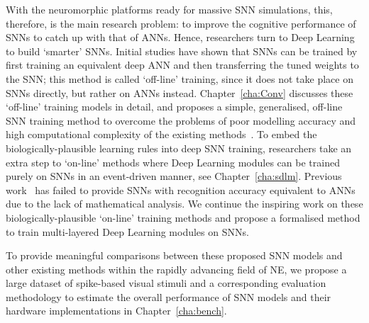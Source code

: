 

With the neuromorphic platforms ready for massive SNN simulations, this, therefore, is the main research problem: to improve the cognitive performance of SNNs to catch up with that of ANNs.
Hence, researchers turn to Deep Learning to build `smarter' SNNs.
Initial studies have shown that SNNs can be trained by first training an equivalent deep ANN and then transferring the tuned weights to the SNN;
this method is called `off-line' training, since it does not take place on SNNs directly, but rather on ANNs instead.
Chapter~\ref{cha:Conv} discusses these `off-line' training models in detail, and proposes a simple, generalised, off-line SNN training method to overcome the problems of poor modelling accuracy and high computational complexity of the existing methods~\citep{Jug_etal_2012,hunsberger2015spiking,diehl2015fast}.
To embed the biologically-plausible learning rules into deep SNN training, researchers take an extra step to `on-line' methods where Deep Learning modules can be trained purely on SNNs in an event-driven manner, see Chapter~\ref{cha:sdlm}.
Previous work~\citep{neil2013online,neftci2013event,burbank2015mirrored} has failed to provide SNNs with recognition accuracy equivalent to ANNs due to the lack of mathematical analysis.
We continue the inspiring work on these biologically-plausible `on-line' training methods and propose a formalised method to train multi-layered Deep Learning modules on SNNs.

To provide meaningful comparisons between these proposed SNN models and other existing methods within the rapidly advancing field of NE, we propose a large dataset of spike-based visual stimuli \DIFaddbegin {}\DIFaddend and a corresponding evaluation methodology to estimate the overall performance of SNN models and their hardware implementations in Chapter~\ref{cha:bench}.

